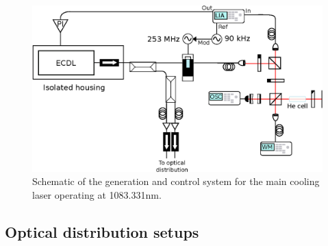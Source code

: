 	\begin{figure}
		\centering
		\includegraphics[width=\textwidth]{fig/apparatus/master_laser_system}
		\caption{Schematic of the generation and control system for the main cooling laser operating at 1083.331nm.  }
		\label{fig:main_laser}
	\end{figure}
	
	



\subsection*{Optical distribution setups}

